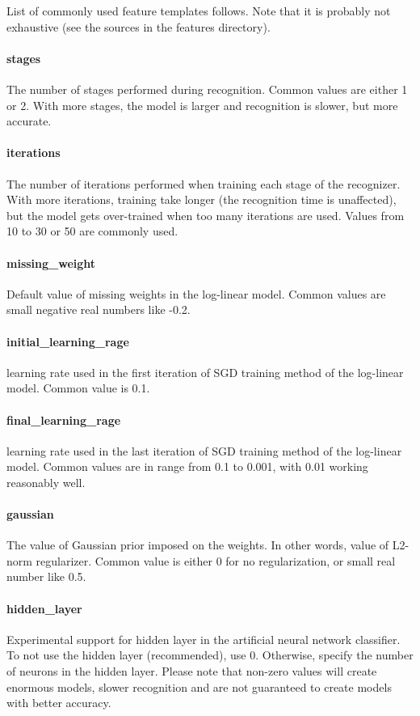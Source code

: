 \documentclass[12pt,a4paper]{report}
\begin{document}
List of commonly used feature templates follows. Note that it is probably not exhaustive (see the sources in the features directory).

\paragraph{stages}
The number of stages performed during recognition. Common values are either 1 or 2. With more stages, the model is larger and recognition is slower, but more accurate.

\paragraph{iterations}
The number of iterations performed when training each stage of the recognizer. With more iterations, training take longer (the recognition time is unaffected), but the model gets over-trained when too many iterations are used. Values from 10 to 30 or 50 are commonly used.

\paragraph{missing\_weight}
Default value of missing weights in the log-linear model. Common values are small negative real numbers like -0.2.

\paragraph{initial\_learning\_rage}
learning rate used in the first iteration of SGD training method of the log-linear model. Common value is 0.1.

\paragraph{final\_learning\_rage}
learning rate used in the last iteration of SGD training method of the log-linear model. Common values are in range from 0.1 to 0.001, with 0.01 working reasonably well.

\paragraph{gaussian}
The value of Gaussian prior imposed on the weights. In other words, value of L2-norm regularizer. Common value is either 0 for no regularization, or small real number like 0.5.

\paragraph{hidden\_layer}
Experimental support for hidden layer in the artificial neural network classifier. To not use the hidden layer (recommended), use 0. Otherwise, specify the number of neurons in the hidden layer. Please note that non-zero values will create enormous models, slower recognition and are not guaranteed to create models with better accuracy.
\end{document}
